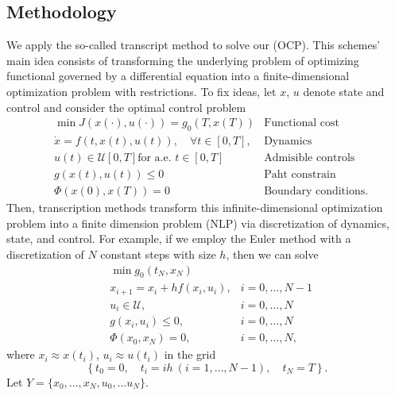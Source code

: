 \subsection{Methodology}
We apply the so-called transcript method to solve our (OCP).
This schemes' main idea consists of transforming the underlying problem of
optimizing functional governed by a differential equation into a
finite-dimensional optimization problem with restrictions. To fix ideas,
let $x$, $u$ denote state and control and consider the optimal
control problem
\begin{equation*}
    \begin{aligned}
        & \min J(x(\cdot), u(\cdot)) = g_0(T, x(T))
        & \text{Functional cost}
        \\
        & \dot{x} = f(t, x(t), u(t)),
        \quad\forall t \in [0, T],
        & \text{Dynamics}
        \\
        & u(t) \in \mathcal{U}[0, T] \text{for a.e. } t\in [0, T]
        & \text{Admisible controls}
        \\
        & g(x(t), u(t)) \leq 0
        & \text{Paht constrain}
        \\
        & \Phi(x(0), x(T)) = 0
        & \text{Boundary conditions}.
    \end{aligned}
\end{equation*}
Then, transcription methods transform this infinite-dimensional
optimization problem into a finite dimension problem (NLP) via
discretization of dynamics, state, and control.  For example, if we
employ the Euler method with a discretization of $N$ constant steps with
size $h$, then we can solve
\begin{equation}
    \label{eqn:nlp}
    \begin{aligned}
        &\min g_0(t_N, x_N)
        \\
        &
        x_{i+1} = x_i + h f(x_i, u_i),
        & i = 0, \dots, N - 1
        \\
        &
        u_i \in \mathcal{U},
        & i = 0, \dots, N
        \\
        &
        g(x_i, u_i) \leq 0,
        & i = 0, \dots, N
        \\
        &
        \Phi(x_0, x_N) = 0,
        &i = 0, \dots, N,
    \end{aligned}
\end{equation}
where $x_i \approx x(t_i)$,
$u_i \approx u(t_i)$ in the grid
$$
\left\{
t_0 = 0,\quad
t_i = i h \ (i=1,\dots, N-1),\quad
t_N = T
\right\}.
$$
Let $Y = \{x_0, \dots, x_N, u_0,\dots u_N\}$.
